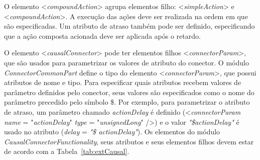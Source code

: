 O elemento <\textit{compoundAction}> agrupa elementos filho: <\textit{simpleAction}> e <\textit{compoundAction}>.  A execução das ações deve ser realizada na ordem em que são especificadas. Um atributo de atraso também pode ser definido, especificando que a ação composta acionada deve ser aplicada após o retardo.

O elemento <\textit{causalConnector}> pode ter elementos filhos <\textit{connectorParam}>, que são usados para parametrizar os valores de atributo do conector. O módulo \textit{ConnectorCommonPart} define o tipo do elemento <\textit{connectorParam}>, que possui atributos de nome e tipo. Para especificar quais atributos recebem valores de parâmetro definidos pelo conector, seus valores são especificados como o nome do parâmetro precedido pelo símbolo \$. Por exemplo, para parametrizar o atributo de atraso, um parâmetro chamado \textit{actionDelay} é definido (<\textit{connectorParam} \textit{name} = "\textit{actionDelay}" \textit{type} = "\textit{unsignedLong}" />) e o valor \textit{"\$actionDelay" }é usado no atributo (\textit{delay} = \textit{"\$ actionDelay"}). Os elementos do módulo \textit{CausalConnectorFunctionality}, seus atributos e seus elementos filhos devem estar de acordo com a Tabela~\ref{tab:extCausal}.

